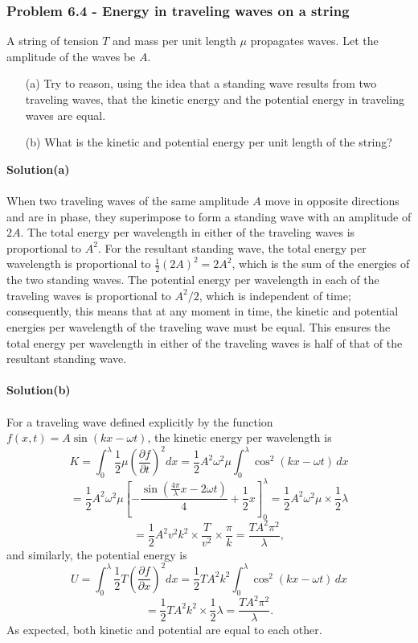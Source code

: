 \documentclass[12pt,a4paper]{article}
\begin{document}
\subsubsection*{Problem 6.4 - Energy in traveling waves on a string}
A string of tension $T$ and mass per unit length $\mu$ propagates waves. Let the amplitude of the waves be $A$.
\begin{enumerate}
    \item[(a)]Try to reason, using the idea that a standing wave results from two traveling waves, that the kinetic energy and the potential energy in traveling waves are equal.
    \item[(b)]What is the kinetic and potential energy per unit length of the string?
\end{enumerate}
\textbf{Solution(a)}
\\
\\When two traveling waves of the same amplitude $A$ move in opposite directions and are in phase, they superimpose to form a standing wave with an amplitude of $2A$. The total energy per wavelength in either of the traveling waves is proportional to $A^2$. For the resultant standing wave, the total energy per wavelength is proportional to $\frac{1}{2}(2A)^2=2A^2$, which is the sum of the energies of the two standing waves. The potential energy per wavelength in each of the traveling waves is proportional to $A^2/2$, which is independent of time; consequently, this means that at any moment in time, the kinetic and potential energies per wavelength of the traveling wave must be equal. This ensures the total energy per wavelength in either of the traveling waves is half of that of the resultant standing wave.
\\
\\\textbf{Solution(b)}
\\
\\For a traveling wave defined explicitly by the function $f(x,t)=A\sin(kx-\omega t)$, the kinetic energy per wavelength is 
\[K=\int_{0}^{\lambda}\frac{1}{2}\mu\left(\frac{\partial f}{\partial t}\right)^2dx=\frac{1}{2}A^2\omega^2\mu\int_{0}^{\lambda}\cos^2(kx-\omega t)\,dx\]
\[=\frac{1}{2}A^2\omega^2\mu\left[-\frac{\sin\left(\frac{4\pi}{\lambda}x-2\omega t\right)}{4}+\frac{1}{2}x\right]_{0}^{\lambda}=\frac{1}{2}A^2\omega^2\mu\times\frac{1}{2}\lambda\]
\[=\frac{1}{2}A^2v^2k^2\times\frac{T}{v^2}\times\frac{\pi}{k}=\frac{TA^2\pi^2}{\lambda},\]
and similarly, the potential energy is
    \[U=\int_{0}^{\lambda}\frac{1}{2}T\left(\frac{\partial f}{\partial x}\right)^2dx=\frac{1}{2}TA^2k^2\int_{0}^{\lambda}\cos^2(kx-\omega t)\,dx\]
    \[=\frac{1}{2}TA^2k^2\times\frac{1}{2}\lambda=\frac{TA^2\pi^2}{\lambda}.\]
As expected, both kinetic and potential are equal to each other.
\end{document}
